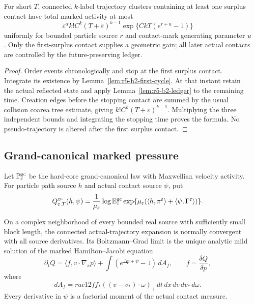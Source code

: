 \begin{theorem}
\label{thm:r5-b2-cyclic}
For short \(T\), connected \(k\)-label trajectory clusters containing at
least one surplus contact have total marked activity at most
\[
 \varepsilon^\alpha k!C^k(T+\varepsilon)^{k-1}
 \exp\{CkT(e^{r+u}-1)\}
\]
uniformly for bounded particle source \(r\) and contact-mark generating
parameter \(u\).  Only the first-surplus contact supplies a geometric gain;
all later actual contacts are controlled by the future-preserving ledger.
\end{theorem}

\begin{proof}
Order events chronologically and stop at the first surplus contact.  Integrate
its existence by Lemma~\ref{lem:r5-b2-first-cycle}.  At that instant retain the
actual reflected state and apply Lemma~\ref{lem:r5-b2-ledger} to the remaining
time.  Creation edges before the stopping contact are summed by the usual
collision coarea tree estimate, giving
\(k!C^k(T+\varepsilon)^{k-1}\).  Multiplying the three independent bounds and
integrating the stopping time proves the formula.  No pseudo-trajectory is
altered after the first surplus contact.
\end{proof}

\subsection{Grand-canonical marked pressure}

Let \(\mathbb P_\varepsilon^{\rm gc}\) be the hard-core grand-canonical law
with Maxwellian velocity activity.  For particle path source \(h\) and actual
contact source \(\psi\), put
\[
 Q_{\varepsilon,T}^{\rm gc}(h,\psi)=
 \frac1{\mu_\varepsilon}
 \log\mathbb E_\varepsilon^{\rm gc}
 \exp\{\mu_\varepsilon(
  \langle h,\pi^\varepsilon\rangle+
  \langle\psi,\Gamma^\varepsilon\rangle)\}.
\]

\begin{theorem}
\label{thm:r5-b2-local-pressure}
On a complex neighborhood of every bounded real source with sufficiently
small block length, the connected actual-trajectory expansion is normally
convergent with all source derivatives.  Its Boltzmann--Grad limit is the
unique analytic mild solution of the marked Hamilton--Jacobi equation
\[
 \partial_tQ=
 \langle f,v\cdot\nabla_xp\rangle+
 \int (e^{\Delta p+\psi}-1)\,dA_f,
 \qquad f=\frac{\delta Q}{\delta p},
\]
where
\[
 dA_f=rac12ff_*((v-v_*)\cdot\omega)_+
 \,dt\,dx\,dv\,dv_*\,d\omega.
\]
Every derivative in \(\psi\) is a factorial moment of the actual contact
measure.
\end{theorem}

